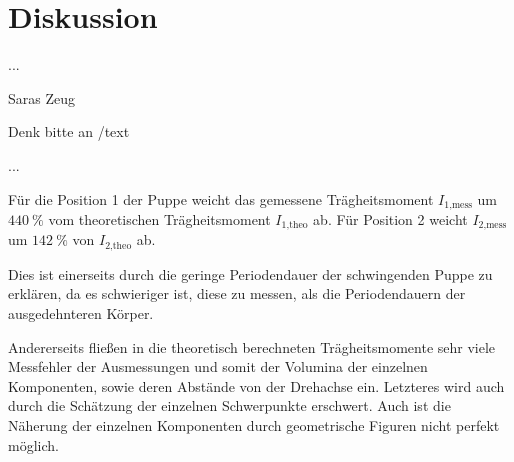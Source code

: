 \section{Diskussion}
\label{sec:Diskussion}

...

Saras Zeug

Denk bitte an /text

...

Für die Position 1 der Puppe weicht das gemessene Trägheitsmoment $I_\text{1,mess}$ um 
$\SI{440}{\percent}$ vom theoretischen Trägheitsmoment $I_\text{1,theo}$ ab. Für Position 2
weicht $I_\text{2,mess}$ um $\SI{142}{\percent}$ von $I_\text{2,theo}$ ab.

Dies ist einerseits durch die geringe Periodendauer der schwingenden Puppe zu erklären,
da es schwieriger ist, diese zu messen, als die Periodendauern der ausgedehnteren Körper.

Andererseits fließen in die theoretisch berechneten Trägheitsmomente sehr viele Messfehler
der Ausmessungen und somit der Volumina der einzelnen Komponenten, sowie deren Abstände 
von der Drehachse ein.
Letzteres wird auch durch die Schätzung der einzelnen Schwerpunkte erschwert. 
Auch ist die Näherung der einzelnen Komponenten durch geometrische Figuren nicht
perfekt möglich.
